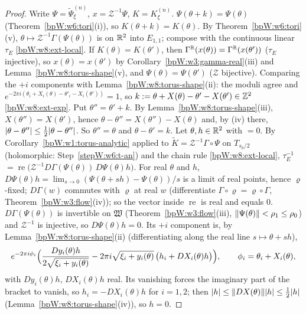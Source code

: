 \begin{proof}
Write $\Psi=\tilde\Psi^{(n)}_\xi$, $x=\mathcal Z^{-1}\Psi$, $K=K^{(n)}_\xi$.
\label{stepW:w8:se-per} $\Psi(\theta+k)=\Psi(\theta)$ (Theorem~\ref{bpW:w6:tori}(i)), so $K(\theta+k)=K(\theta)$.
\label{stepW:w8:se-an} By Theorem~\ref{bpW:w6:tori}(v), $\theta\mapsto\mathcal Z^{-1}\Gamma(\Psi(\theta))$ is
 on $\mathbb{R}^2$ into $E_{1,1}$; compose with the continuous linear $\tau_E$ \ref{bpW:w8:ext-local}.
\label{stepW:w8:se-inj} If $K(\theta)=K(\theta')$, then $\Gamma^{\mathbb{R}}(x(\theta))=\Gamma^{\mathbb{R}}(x(\theta'))$
($\tau_E$ injective), so $x(\theta)=x(\theta')$ by Corollary~\ref{bpW:w3:gamma-real}(iii) and
Lemma~\ref{bpW:w8:torus-shape}(v), and $\Psi(\theta)=\Psi(\theta')$ ($\mathcal Z$ bijective). Comparing the $+i$ components with
Lemma~\ref{bpW:w8:torus-shape}(ii): the moduli agree and $e^{-2\pi i(\theta_i+X_i(\theta)-\theta'_i-X_i(\theta'))}=1$, so
$k:=\theta+X(\theta)-\theta'-X(\theta')\in\mathbb{Z}^2$ \ref{bpW:w8:ext-exp}. Put $\theta''=\theta'+k$. By Lemma~\ref{bpW:w8:torus-shape}(iii),
$X(\theta'')=X(\theta')$, hence $\theta-\theta''=X(\theta'')-X(\theta)$ and, by (iv) there,
$\lvert \theta-\theta''\rvert\le\frac12\lvert \theta-\theta''\rvert$. So $\theta''=\theta$ and $\theta-\theta'=k$.
\label{stepW:w8:se-der} Let $\theta,h\in\mathbb{R}^2$ with  $=0$. By
Corollary~\ref{bpW:w1:torus-analytic} applied to $\tilde K=\mathcal Z^{-1}\Gamma\circ\Psi$ on $T_{s_0/2}$ (holomorphic: Step~\ref{stepW:w6:t-an})
and the chain rule \ref{bpW:w8:ext-local}, $\tau_E^{-1}$ $=\operatorname{re}\bigl(\mathcal Z^{-1}D\Gamma(\Psi(\theta))\,D\Psi(\theta)h\bigr)$.
For real $\theta$ and $h$, $D\Psi(\theta)h=\lim_{s\to0}(\Psi(\theta+sh)-\Psi(\theta))/s$ is a limit of real points, hence $\varrho$-fixed;
$D\Gamma(w)$ commutes with $\varrho$ at real $w$ (differentiate $\Gamma\circ\varrho=\varrho\circ\Gamma$, Theorem~\ref{bpW:w3:flow}(iv));
so the vector inside $\operatorname{re}$ is real and equals $0$. $D\Gamma(\Psi(\theta))$ is invertible on $\mathfrak W$
(Theorem~\ref{bpW:w3:flow}(iii), $\lVert \Psi(\theta)\rVert<\rho_1\le\rho_0$) and $\mathcal Z^{-1}$ is injective, so $D\Psi(\theta)h=0$. Its
$+i$ component is, by Lemma~\ref{bpW:w8:torus-shape}(ii) (differentiating along the real line $s\mapsto\theta+sh$),
\[e^{-2\pi i\phi_i}\Bigl(\frac{Dy_i(\theta)h}{2\sqrt{\xi_i+y_i(\theta)}}-2\pi i\sqrt{\xi_i+y_i(\theta)}\,\bigl(h_i+DX_i(\theta)h\bigr)\Bigr),
\qquad\phi_i=\theta_i+X_i(\theta),\]
with $Dy_i(\theta)h$, $DX_i(\theta)h$ real. Its vanishing forces the imaginary part of the bracket to vanish, so $h_i=-DX_i(\theta)h$ for
$i=1,2$; then $\lvert h\rvert\le\lVert DX(\theta)\rVert\lvert h\rvert\le\frac12\lvert h\rvert$ (Lemma~\ref{bpW:w8:torus-shape}(iv)), so $h=0$.
\end{proof}

